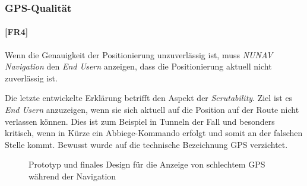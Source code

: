 \subsubsection{GPS-Qualität}
\label{sec:gps_accuracy_definition}

\paragraph{[FR4]} Wenn die Genauigkeit der Positionierung unzuverlässig ist, muss \textit{NUNAV Navigation} den \textit{End Usern} anzeigen, dass die Positionierung aktuell nicht zuverlässig ist.

Die letzte entwickelte Erklärung betrifft den Aspekt der \textit{Scrutability}. Ziel ist es \textit{End Usern} anzuzeigen, wenn sie sich aktuell auf die Position auf der Route nicht verlassen können. Dies ist zum Beispiel in Tunneln der Fall und besonders kritisch, wenn in Kürze ein Abbiege-Kommando erfolgt und somit an der falschen Stelle kommt. Bewusst wurde auf die technische Bezeichnung \glqq GPS\grqq{} verzichtet.

\begin{figure}[htb!]
    \centering
    \hspace{.055\textwidth}
    \caption{Prototyp und finales Design für die Anzeige von schlechtem GPS während der Navigation}
    \label{fig:prototype_position_accuracy}
\end{figure}

